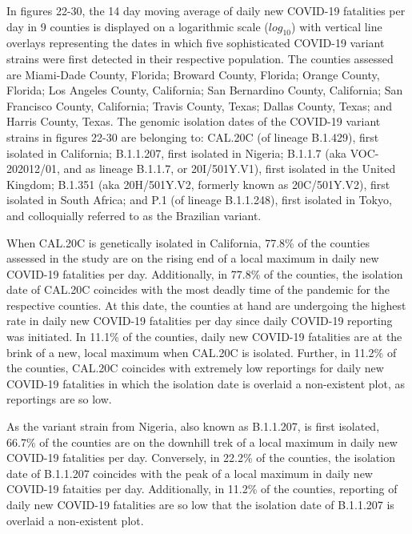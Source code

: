\documentclass[]{article}
\begin{document}
\FloatBarrier

\indent In figures 22-30, the 14 day moving average of daily new COVID-19 fatalities per day in 9 counties is displayed on a logarithmic scale ($log_{10}$) with vertical line overlays representing the dates in which five sophisticated COVID-19 variant strains were first detected in their respective population. The counties assessed are Miami-Dade County, Florida; Broward County, Florida; Orange County, Florida; Los Angeles County, California; San Bernardino County, California; San Francisco County, California; Travis County, Texas; Dallas County, Texas; and Harris County, Texas. The genomic isolation dates of the COVID-19 variant strains in figures 22-30 are belonging to: CAL.20C (of lineage B.1.429), first isolated in California; B.1.1.207, first isolated in Nigeria; B.1.1.7 (aka VOC-202012/01, and as lineage B.1.1.7, or 20I/501Y.V1), first isolated in the United Kingdom; B.1.351 (aka 20H/501Y.V2, formerly known as 20C/501Y.V2), first isolated in South Africa; and P.1 (of lineage B.1.1.248), first isolated in Tokyo, and colloquially referred to as the Brazilian variant.

\indent When CAL.20C is genetically isolated in California, 77.8\% of the counties assessed in the study are on the rising end of a local maximum in daily new COVID-19 fatalities per day. Additionally, in 77.8\% of the counties, the isolation date of CAL.20C coincides with the most deadly time of the pandemic for the respective counties. At this date, the counties at hand are undergoing the highest rate in daily new COVID-19 fatalities per day since daily COVID-19 reporting was initiated. In 11.1\% of the counties, daily new COVID-19 fatalities are at the brink of a new, local maximum when CAL.20C is isolated. Further, in 11.2\% of the counties, CAL.20C coincides with extremely low reportings for daily new COVID-19 fatalities in which the isolation date is overlaid a non-existent plot, as reportings are so low. 

\indent As the variant strain from Nigeria, also known as B.1.1.207, is first isolated, 66.7\% of the counties are on the downhill trek of a local maximum in daily new COVID-19 fatalities per day. Conversely, in 22.2\% of the counties, the isolation date of B.1.1.207 coincides with the peak of a local maximum in daily new COVID-19 fataities per day. Additionally, in 11.2\% of the counties, reporting of daily new COVID-19 fatalities are so low that the isolation date of B.1.1.207 is overlaid a non-existent plot. 
\end{document}
